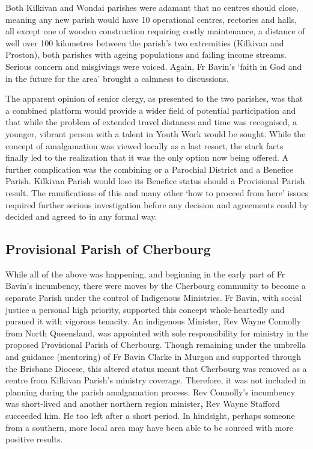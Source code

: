 Both Kilkivan and Wondai parishes were adamant that no centres should close, meaning any new parish would have 10 operational centres, rectories and halls, all except one of wooden construction requiring costly maintenance, a distance of well over 100 kilometres between the parish's two extremities (Kilkivan and Proston), both parishes with ageing populations and failing income streams. Serious concern and misgivings were voiced. Again, Fr Bavin's `faith in God and in the future for the area' brought a calmness to discussions.



The apparent opinion of senior clergy, as presented to the two parishes, was that a combined platform would provide a wider field of potential participation and that while the problem of extended travel distances and time was recognised, a younger, vibrant person with a talent in Youth Work would be sought. While the concept of amalgamation was viewed locally as a last resort, the stark facts finally led to the realization that it was the only option now being offered. A further complication was the combining or a Parochial District and a Benefice Parish. Kilkivan Parish would lose its Benefice status should a Provisional Parish result. The ramifications of this and many other `how to proceed from here' issues required further serious investigation before any decision and agreements could by decided and agreed to in any formal way.



\subsection{Provisional Parish of Cherbourg}



While all of the above was happening, and beginning in the early part of Fr Bavin's incumbency, there were moves by the Cherbourg community to become a separate Parish under the control of Indigenous Ministries. Fr Bavin, with social justice a personal high priority, supported this concept whole-heartedly and pursued it with vigorous tenacity. An indigenous Minister, Rev Wayne Connolly from North Queensland, was appointed with sole responsibility for ministry in the proposed Provisional Parish of Cherbourg. Though remaining under the umbrella and guidance (mentoring) of Fr Bavin Clarke in Murgon and supported through the Brisbane Diocese, this altered status meant that Cherbourg was removed as a centre from Kilkivan Parish's ministry coverage. Therefore, it was not included in planning during the parish amalgamation process. Rev Connolly's incumbency was short-lived and another northern region minister\textbf{,} Rev Wayne Stafford succeeded him. He too left after a short period. In hindsight, perhaps someone from a southern, more local area may have been able to be sourced with more positive results.



